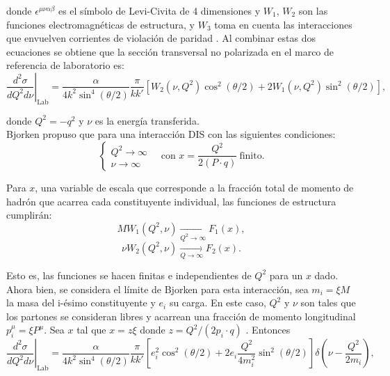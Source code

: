 \documentclass[titlepage,11pt]{report}
\begin{document}
\noindent donde $\epsilon^{\mu\nu\alpha\beta}$ es el símbolo de Levi-Civita de 4 dimensiones y $W_1$, $W_2$ son las funciones electromagnéticas de estructura, y $W_3$ toma en cuenta las interacciones que envuelven corrientes de violación de paridad \cite{Lopez2025}. Al combinar estas dos ecuaciones se obtiene que la sección transversal no polarizada en el marco de referencia de laboratorio es:
\begin{equation*}
    \left.\frac{d^2\sigma}{dQ^2d\nu}\right|_{\text{Lab}}=\frac{\alpha}{4k^2\sin^{4}(\theta/2)}\frac{\pi}{kk'}[W_2(\nu, Q^2)\cos^2(\theta/2)+2W_1(\nu, Q^2)\sin^2(\theta/2)],
\end{equation*}

donde $Q^2=-q^2$ y $\nu$ es la energía transferida. \\

Bjorken propuso que para una interacción DIS con las siguientes condiciones:
\begin{equation}
    \left\{
\begin{array}{l}
Q^2 \to \infty \\
\nu \to \infty
\end{array}
\right. \quad \text{con } x = \frac{Q^2}{2(P \cdot q)}\ \text{finito}.
\end{equation}


Para $x$, una variable de escala que corresponde a la fracción total de momento de hadrón que acarrea cada constituyente individual, las funciones de estructura cumplirán:
\begin{equation*}
    MW_1(Q^2, \nu)\underset{Q^2 \to \infty}{\longrightarrow} F_1(x),
\end{equation*}
\begin{equation*}
    \nu W_2(Q^2, \nu)\underset{Q \to \infty}{\longrightarrow} F_2(x).
\end{equation*}

Esto es, las funciones se hacen finitas e independientes de $Q^2$ para un $x$ dado. \\

Ahora bien, se considera el límite de Bjorken para esta interacción, sea $m_i=\xi M$ la masa del i-ésimo constituyente y $e_i$ su carga. En este caso, $Q^2$ y $\nu$ son tales que los partones se consideran libres y acarrean una fracción de momento longitudinal $p_i^{\mu}=\xi P^{\mu}$. Sea $x$ tal que $x=z\xi$ donde $z=Q^2/(2p_i\cdot q)$ \cite{PhysRev.179.1547}. Entonces
\begin{equation*}
    \left.\frac{d^2\sigma}{dQ^2d\nu}\right|_{\text{Lab}}=\frac{\alpha}{4k^2\sin^{4}(\theta/2)}\frac{\pi}{kk'}[e_i^2\cos^2(\theta/2)+2e_i\frac{Q^2}{4m_i^2}\sin^2(\theta/2)]\delta\left(\nu-\frac{Q^2}{2m_i}\right),
\end{equation*}
\end{document}
